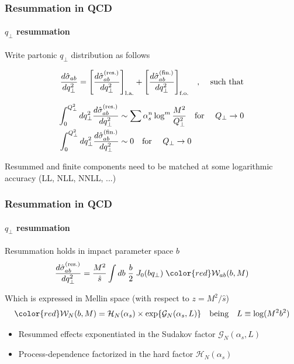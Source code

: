 \documentclass[aspectratio=43]{beamer}
\begin{document}
\begin{frame}

	\frametitle{Resummation in QCD}
	\framesubtitle{$q_{\perp}$ resummation}

	Write partonic $q_{\perp}$ distribution as follows
	
	\begin{equation}
		\frac{d\hat{\sigma}_{ab}}{dq_{\perp}^{2}} =
		\Bigg[ \frac{d\hat{\sigma}^{\textrm{(res.)}}_{ab}}{dq_{\perp}^{2}} \Bigg]_{\textrm{l.a.}} + 
		\Bigg[ \frac{d\hat{\sigma}^{\textrm{(fin.)}}_{ab}}{dq_{\perp}^{2}} \Bigg]_{\textrm{f.o.}} \textrm{\quad, \quad such that} \nonumber
	\end{equation}

	\begin{align}
		\int_{0}^{Q_{\perp}^{2}} dq_{\perp}^{2} \frac{d\hat{\sigma}^{\textrm{(res.)}}_{ab}}{dq_{\perp}^{2}} &\sim \sum \alpha_{s}^{n} \log^{m} \frac{M^{2}}{Q_{\perp}^{2}} \textrm{\quad for \quad} Q_{\perp} \rightarrow 0 \nonumber \\
		\int_{0}^{Q_{\perp}^{2}} dq_{\perp}^{2} \frac{d\hat{\sigma}^{\textrm{(fin.)}}_{ab}}{dq_{\perp}^{2}} &\sim 0 \nonumber \textrm{\quad for \quad} Q_{\perp} \rightarrow 0
	\end{align}

	Resummed and finite components need to be matched at some logarithmic accuracy (LL, NLL, NNLL, ...)

\end{frame}

\begin{frame}

	\frametitle{Resummation in QCD}
	\framesubtitle{$q_{\perp}$ resummation}
	
	Resummation holds in impact parameter space $b$
	\begin{equation}
		\frac{d\hat{\sigma}_{ab}^{\textrm{(res.)}}}{dq_{\perp}^{2}} = \frac{M^{2}}{\hat{s}} \int db \; \frac{b}{2} \; J_{0}(b q_{\perp}) \; {\color{red} \mathcal{W}_{ab}(b, M)} \nonumber
	\end{equation}
	
	Which is expressed in Mellin space (with respect to $z = M^{2}/\hat{s}$)
	\begin{equation}
		{\color{red} \mathcal{W}_{N}(b, M) = \mathcal{H}_{N}(\alpha_{s}) \times \exp\{\mathcal{G}_{N}(\alpha_{s}, L)\}} \quad\textrm{being}\quad L \equiv \log(M^{2}b^{2}) \nonumber
	\end{equation}

	\begin{itemize}
		\item Resummed effects exponentiated in the Sudakov factor {\color{red}$\mathcal{G}_{N}(\alpha_{s}, L)$}
		\item Process-dependence factorized in the hard factor {\color{red}$\mathcal{H}_{N}(\alpha_{s})$}
	\end{itemize}

	
\end{frame}
\end{document}
